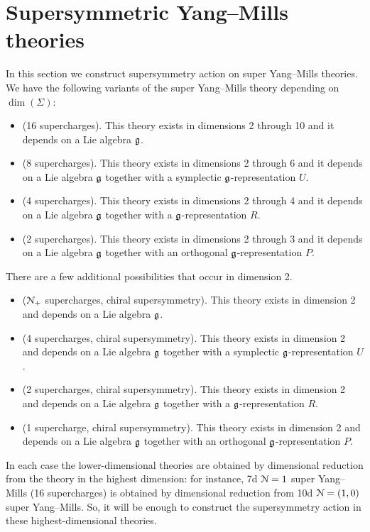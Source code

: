 \documentclass[10pt, oneside]{article}
\begin{document}
\section{Supersymmetric Yang--Mills theories}

In this section we construct supersymmetry action on super Yang--Mills theories. We have the following variants of the super Yang--Mills theory depending on $\dim(\Sigma)$:
\begin{itemize}
\item (16 supercharges). This theory exists in dimensions 2 through 10 and it depends on a Lie algebra $\mathfrak g$.

\item (8 supercharges). This theory exists in dimensions 2 through 6 and it depends on a Lie algebra $\mathfrak g$ together with a symplectic $\mathfrak g$-representation $U$.

\item (4 supercharges). This theory exists in dimensions 2 through 4 and it depends on a Lie algebra $\mathfrak g$ together with a $\mathfrak g$-representation $R$.

\item (2 supercharges). This theory exists in dimensions 2 through 3 and it depends on a Lie algebra $\mathfrak g$ together with an orthogonal $\mathfrak g$-representation $P$.
\end{itemize}

There are a few additional possibilities that occur in dimension 2.

\begin{itemize}
\item ($\mathcal N_+$ supercharges, chiral supersymmetry). This theory exists in dimension 2 and depends on a Lie algebra $\mathfrak g$.

\item (4 supercharges, chiral supersymmetry). This theory exists in dimension 2 and depends on a Lie algebra $\mathfrak g$ together with a symplectic $\mathfrak g$-representation $U$.

\item (2 supercharges, chiral supersymmetry). This theory exists in dimension 2 and depends on a Lie algebra $\mathfrak g$ together with a $\mathfrak g$-representation $R$.

\item (1 supercharge, chiral supersymmetry). This theory exists in dimension 2 and depends on a Lie algebra $\mathfrak g$ together with an orthogonal $\mathfrak g$-representation $P$.
\end{itemize}

In each case the lower-dimensional theories are obtained by dimensional reduction from the theory in the highest dimension: for instance, 7d $\mathcal{N}=1$ super Yang--Mills (16 supercharges) is obtained by dimensional reduction from 10d $\mathcal{N}=(1, 0)$ super Yang--Mills. So, it will be enough to construct the supersymmetry action in these highest-dimensional theories.
\end{document}
